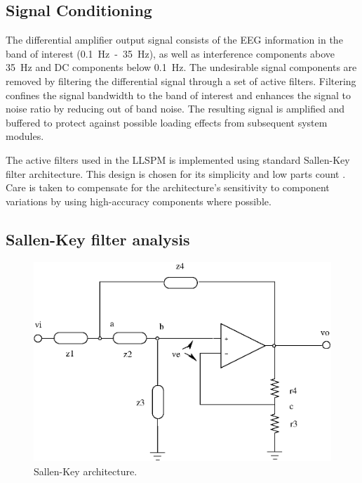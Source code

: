 \subsection{Signal Conditioning}
The differential amplifier output signal consists of the EEG
information in the band of interest (0.1~Hz~-~35~Hz), as well as
interference components above 35~Hz and DC components below
0.1~Hz. The undesirable signal components are removed by filtering the
differential signal through a set of active filters. Filtering
confines the signal bandwidth to the band of interest and enhances the
signal to noise ratio by reducing out of band noise. The resulting
signal is amplified and buffered to protect against possible loading
effects from subsequent system modules.

The active filters used in the LLSPM is implemented using standard
Sallen-Key filter architecture. This design is chosen for its
simplicity and low parts count \cite[p273]{art}. Care is taken to
compensate for the architecture's sensitivity to component variations
by using high-accuracy components where possible.


\subsection{Sallen-Key filter analysis}
\label{section:sk}
\begin{figure}[htbp]
	\psfrag{+}{+}
	\psfrag{-}{--}
	\includegraphics{sallen-key-gen.eps}
	\caption{Sallen-Key architecture.}
	\label{fig:sallen-key} 
\end{figure}

